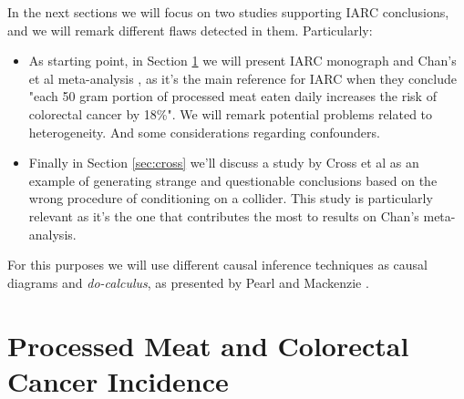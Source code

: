 \documentclass{article}
\begin{document}
In the next sections we will focus on two studies supporting IARC conclusions, and we will remark different flaws detected in them. Particularly:

\begin{itemize}

\item As starting point, in Section \ref{sec:iarc} we will present IARC monograph and Chan's et al meta-analysis \cite{chan}, as it's the main reference for IARC when they conclude "each 50 gram portion of processed meat eaten daily increases the risk of colorectal cancer by 18\%". We will remark potential problems related to heterogeneity. And some considerations regarding confounders. %
\item Finally in Section \ref{sec:cross} we'll discuss a study by Cross et al \cite{cross} as an example of generating strange and questionable conclusions based on the wrong procedure of conditioning on a collider. This study is particularly relevant as it's the one that contributes the most to results on Chan's meta-analysis.%

\end{itemize}

For this purposes we will use different causal inference techniques as causal diagrams and \textit{do-calculus}, as presented by Pearl and Mackenzie \cite{bookofwhy}.

\section{Processed Meat and Colorectal Cancer Incidence}
\label{sec:iarc}
\end{document}
